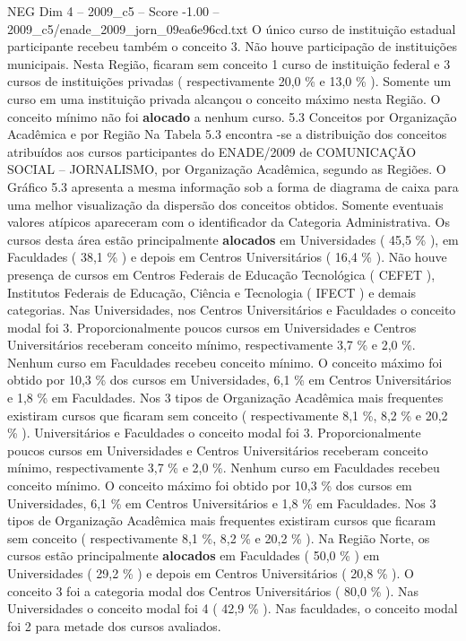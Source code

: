 \begin{textsample}{NEG Dim 4 – 2009\_c5 – Score -1.00 – 2009\_c5/enade\_2009\_jorn\_09ea6e96cd.txt}
O único curso de instituição estadual participante recebeu também o conceito 3.
Não houve participação de instituições municipais.
Nesta Região, ficaram sem conceito 1 curso de instituição federal e 3 cursos de instituições privadas ( respectivamente 20,0 \% e 13,0 \% ).
Somente um curso em uma instituição privada alcançou o conceito máximo nesta Região.
O conceito mínimo não foi \textbf{alocado} a nenhum curso. 5.3 Conceitos por Organização Acadêmica e por Região Na Tabela 5.3 encontra -se a distribuição dos conceitos atribuídos aos cursos participantes do ENADE/2009 de COMUNICAÇÃO SOCIAL – JORNALISMO, por Organização Acadêmica, segundo as Regiões.
O Gráfico 5.3 apresenta a mesma informação sob a forma de diagrama de caixa para uma melhor visualização da dispersão dos conceitos obtidos.
Somente eventuais valores atípicos apareceram com o identificador da Categoria Administrativa.
Os cursos desta área estão principalmente \textbf{alocados} em Universidades ( 45,5 \% ), em Faculdades ( 38,1 \% ) e depois em Centros Universitários ( 16,4 \% ).
Não houve presença de cursos em Centros Federais de Educação Tecnológica ( CEFET ), Institutos Federais de Educação, Ciência e Tecnologia ( IFECT ) e demais categorias.
Nas Universidades, nos Centros Universitários e Faculdades o conceito modal foi 3.
Proporcionalmente poucos cursos em Universidades e Centros Universitários receberam conceito mínimo, respectivamente 3,7 \% e 2,0 \%.
Nenhum curso em Faculdades recebeu conceito mínimo.
O conceito máximo foi obtido por 10,3 \% dos cursos em Universidades, 6,1 \% em Centros Universitários e 1,8 \% em Faculdades.
Nos 3 tipos de Organização Acadêmica mais frequentes existiram cursos que ficaram sem conceito ( respectivamente 8,1 \%, 8,2 \% e 20,2 \% ).
Universitários e Faculdades o conceito modal foi 3.
Proporcionalmente poucos cursos em Universidades e Centros Universitários receberam conceito mínimo, respectivamente 3,7 \% e 2,0 \%.
Nenhum curso em Faculdades recebeu conceito mínimo.
O conceito máximo foi obtido por 10,3 \% dos cursos em Universidades, 6,1 \% em Centros Universitários e 1,8 \% em Faculdades.
Nos 3 tipos de Organização Acadêmica mais frequentes existiram cursos que ficaram sem conceito ( respectivamente 8,1 \%, 8,2 \% e 20,2 \% ).
Na Região Norte, os cursos estão principalmente \textbf{alocados} em Faculdades ( 50,0 \% ) em Universidades ( 29,2 \% ) e depois em Centros Universitários ( 20,8 \% ).
O conceito 3 foi a categoria modal dos Centros Universitários ( 80,0 \% ).
Nas Universidades o conceito modal foi 4 ( 42,9 \% ).
Nas faculdades, o conceito modal foi 2 para metade dos cursos avaliados.

\end{textsample}
